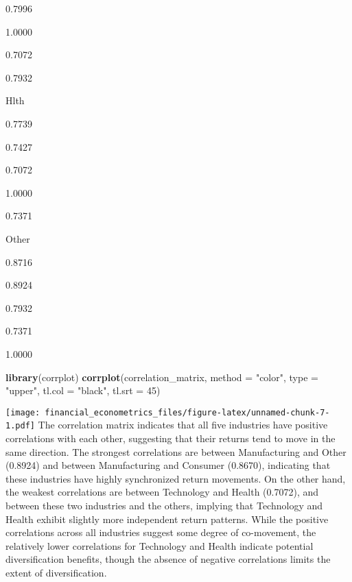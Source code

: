 \documentclass[
]{article}
\newenvironment{Shaded}{\begin{snugshade}}{\end{snugshade}}
\newcommand{\AttributeTok}[1]{\textcolor[rgb]{0.13,0.29,0.53}{#1}}
\newcommand{\DecValTok}[1]{\textcolor[rgb]{0.00,0.00,0.81}{#1}}
\newcommand{\FunctionTok}[1]{\textcolor[rgb]{0.13,0.29,0.53}{\textbf{#1}}}
\newcommand{\NormalTok}[1]{#1}
\newcommand{\StringTok}[1]{\textcolor[rgb]{0.31,0.60,0.02}{#1}}
\begin{document}
0.7996

1.0000

0.7072

0.7932

Hlth

0.7739

0.7427

0.7072

1.0000

0.7371

Other

0.8716

0.8924

0.7932

0.7371

1.0000

\begin{Shaded}
\begin{Highlighting}[]
\FunctionTok{library}\NormalTok{(corrplot)}
\FunctionTok{corrplot}\NormalTok{(correlation\_matrix, }\AttributeTok{method =} \StringTok{"color"}\NormalTok{, }\AttributeTok{type =} \StringTok{"upper"}\NormalTok{, }
         \AttributeTok{tl.col =} \StringTok{"black"}\NormalTok{, }\AttributeTok{tl.srt =} \DecValTok{45}\NormalTok{)}
\end{Highlighting}
\end{Shaded}

\texttt{[image: financial\_econometrics\_files/figure-latex/unnamed-chunk-7-1.pdf]}
The correlation matrix indicates that all five industries have positive
correlations with each other, suggesting that their returns tend to move
in the same direction. The strongest correlations are between
Manufacturing and Other (0.8924) and between Manufacturing and Consumer
(0.8670), indicating that these industries have highly synchronized
return movements. On the other hand, the weakest correlations are
between Technology and Health (0.7072), and between these two industries
and the others, implying that Technology and Health exhibit slightly
more independent return patterns. While the positive correlations across
all industries suggest some degree of co-movement, the relatively lower
correlations for Technology and Health indicate potential
diversification benefits, though the absence of negative correlations
limits the extent of diversification.
\end{document}
